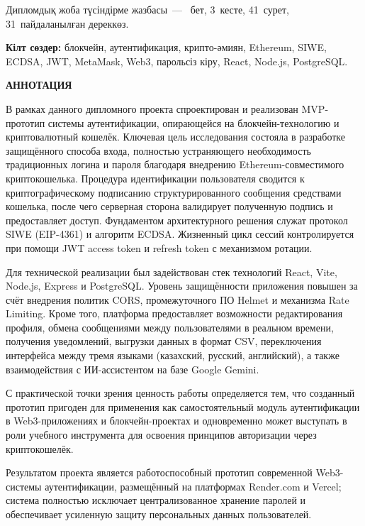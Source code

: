 \documentclass[14pt,a4paper]{extarticle}
\begin{document}
Дипломдық жоба түсіндірме жазбасы~--- \pageref{LastPage}~бет, 3~кесте, 41~сурет, 31~пайдаланылған дереккөз.

\textbf{Кілт сөздер:} блокчейн, аутентификация, крипто-әмиян, Ethereum, SIWE, ECDSA, JWT, MetaMask, Web3, парольсіз кіру, React, Node.js, PostgreSQL.

\newpage\thispagestyle{empty}
\small
\begin{center}\textbf{АННОТАЦИЯ}\end{center}

В рамках данного дипломного проекта спроектирован и реализован MVP-прототип системы аутентификации, опирающейся на блокчейн-технологию и криптовалютный кошелёк. Ключевая цель исследования состояла в разработке защищённого способа входа, полностью устраняющего необходимость традиционных логина и пароля благодаря внедрению Ethereum-совместимого криптокошелька. Процедура идентификации пользователя сводится к криптографическому подписанию структурированного сообщения средствами кошелька, после чего серверная сторона валидирует полученную подпись и предоставляет доступ. Фундаментом архитектурного решения служат протокол SIWE (EIP-4361) и алгоритм ECDSA. Жизненный цикл сессий контролируется при помощи JWT access token и refresh token с механизмом ротации.

Для технической реализации был задействован стек технологий React, Vite, Node.js, Express и PostgreSQL. Уровень защищённости приложения повышен за счёт внедрения политик CORS, промежуточного ПО Helmet и механизма Rate Limiting. Кроме того, платформа предоставляет возможности редактирования профиля, обмена сообщениями между пользователями в реальном времени, получения уведомлений, выгрузки данных в формат CSV, переключения интерфейса между тремя языками (казахский, русский, английский), а также взаимодействия с ИИ-ассистентом на базе Google Gemini.

С практической точки зрения ценность работы определяется тем, что созданный прототип пригоден для применения как самостоятельный модуль аутентификации в Web3-приложениях и блокчейн-проектах и одновременно может выступать в роли учебного инструмента для освоения принципов авторизации через криптокошелёк.

Результатом проекта является работоспособный прототип современной Web3-системы аутентификации, размещённый на платформах Render.com и Vercel; система полностью исключает централизованное хранение паролей и обеспечивает усиленную защиту персональных данных пользователей.
\end{document}
